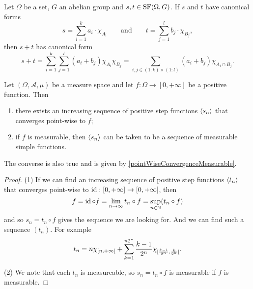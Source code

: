 \begin{lemma}
Let $\Omega$ be a set, $G$ an abelian group and $s,t\in\operatorname{SF}(\Omega,G)$. If $s$ and $t$ have canonical forms
\[ s = \sum_{i=1}^k a_i\cdot\chi_{A_i} \qquad\text{and}\qquad t = \sum_{j=1}^l b_j\cdot\chi_{B_j}, \]
then $s+t$ has canonical form
\[ s+t = \sum_{i=1}^k\sum_{j=1}^l (a_i+b_j)\chi_{A_i}\chi_{B_j} = \sum_{i,j \in (1:k)\times(1:l)}(a_i+b_j)\chi_{A_i\cap B_j}. \]
\end{lemma}


\begin{proposition} \label{measurableFunctionPointwiseLimitSimpleFunctions}
Let $(\Omega, \mathcal{A}, \mu)$ be a measure space and let $f:\Omega\to[0,+\infty]$ be a positive function. Then
\begin{enumerate}
\item there exists an increasing sequence of positive step functions $\left\langle s_n \right\rangle$ that converges point-wise to $f$;
\item if $f$ is measurable, then $\left\langle s_n \right\rangle$ can be taken to be a sequence of measurable simple functions.
\end{enumerate}
\end{proposition}
The converse is also true and is given by \ref{pointWiseConvergenceMeasurable}.
\begin{proof}
(1) If we can find an increasing sequence of positive step functions $\left\langle t_n \right\rangle$ that converges point-wise to $\operatorname{id}:[0,+\infty]\to[0,+\infty]$, then
\[ f = \operatorname{id}\circ f = \lim_{n\to\infty} t_n\circ f = \sup_{n\in\mathbb{N}}(t_n\circ f) \]
and so $s_n = t_n\circ f$ gives the sequence we are looking for. And we can find such a sequence $(t_n)$. For example
\[ t_n = n\charFunc{\interval[co]{n,+\infty}}+\sum_{k=1}^{n2^n}\frac{k-1}{2^n}\charFunc{\interval[co]{\frac{k-1}{2^n},\frac{k}{2^n}}}. \]

(2) We note that each $t_n$ is measureable, so $s_n = t_n \circ f$ is measurable if $f$ is measurable.
\end{proof}


